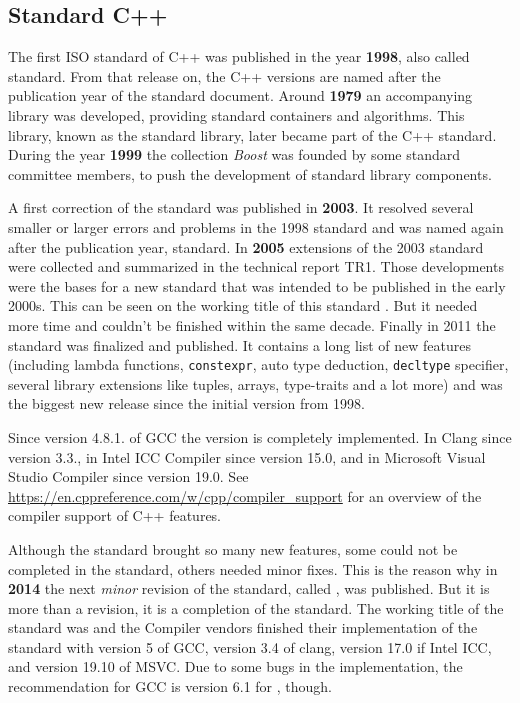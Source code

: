 \subsection{Standard C++}
The first ISO standard of C++ was published in the year \textbf{1998}, also called  standard. From that release on, the C++ versions are
named after the publication year of the standard document. Around \textbf{1979} an accompanying library was developed, providing standard
containers and algorithms. This library, known as the standard library, later became part of the C++ standard. During the year \textbf{1999}
the collection \emph{Boost} was founded by some standard committee members, to push the development of standard library components.

A first correction of the  standard was published in \textbf{2003}. It resolved several smaller or larger errors and problems in the
1998 standard and was named again after the publication year,  standard. In \textbf{2005} extensions of the 2003 standard were collected
and summarized in the technical report TR1. Those developments were the bases for a new standard that was intended to be published in the
early 2000s. This can be seen on the working title of this standard . But it needed more time and couldn't be finished within the same
decade. Finally in 2011 the standard  was finalized and published. It contains a long list of new features (including lambda functions,
\texttt{constexpr}, auto type deduction, \texttt{decltype} specifier, several library extensions like tuples, arrays, type-traits and a lot more) and was the
biggest new release since the initial version from 1998.

Since version 4.8.1. of GCC the  version is completely implemented. In Clang since version 3.3., in Intel ICC Compiler since version 15.0,
and in Microsoft Visual Studio Compiler since version 19.0. See \url{https://en.cppreference.com/w/cpp/compiler_support} for an overview of
the compiler support of C++ features.

Although the  standard brought so many new features, some could not be completed in the standard, others needed minor fixes. This is the reason
why in \textbf{2014} the next \emph{minor} revision of the standard, called , was published. But it is more than a revision, it is a completion
of the  standard. The working title of the standard was  and the Compiler vendors finished their implementation of the standard
with version 5 of GCC, version 3.4 of clang, version 17.0 if Intel ICC, and version 19.10 of MSVC. Due to some bugs in the implementation,
the recommendation for GCC is version 6.1 for , though.

